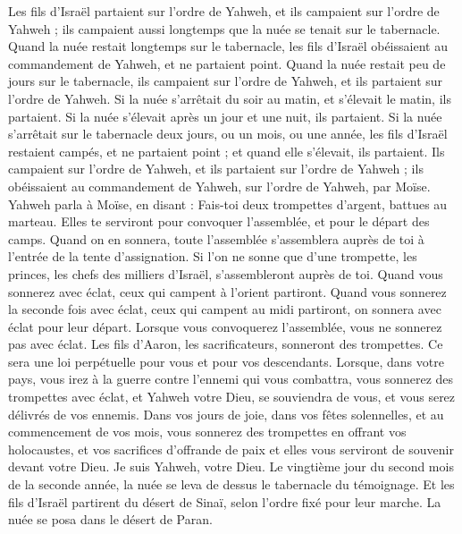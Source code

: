 \begin{multicols}{2}
Les fils d'Israël partaient sur l’ordre de Yahweh, et ils campaient sur l’ordre de Yahweh ; ils campaient aussi longtemps que la nuée se tenait sur le tabernacle.
Quand la nuée restait longtemps sur le tabernacle, les fils d'Israël obéissaient au commandement de Yahweh, et ne partaient point.
Quand la nuée restait peu de jours sur le tabernacle, ils campaient sur l’ordre de Yahweh, et ils partaient sur l’ordre de Yahweh.
Si la nuée s’arrêtait du soir au matin, et s’élevait le matin, ils partaient. Si la nuée s’élevait après un jour et une nuit, ils partaient.
Si la nuée s'arrêtait sur le tabernacle deux jours, ou un mois, ou une année, les fils d'Israël restaient campés, et ne partaient point ; et quand elle s’élevait, ils partaient.
Ils campaient sur l’ordre de Yahweh, et ils partaient sur l’ordre de Yahweh ; ils obéissaient au commandement de Yahweh, sur l’ordre de Yahweh, par Moïse.
\VerseOne{}Yahweh parla à Moïse, en disant :
Fais-toi deux trompettes d'argent, battues au marteau. Elles te serviront pour convoquer l'assemblée, et pour le départ des camps.
Quand on en sonnera, toute l'assemblée s'assemblera auprès de toi à l'entrée de la tente d'assignation.
Si l’on ne sonne que d'une trompette, les princes, les chefs des milliers d'Israël, s'assembleront auprès de toi.
Quand vous sonnerez avec éclat, ceux qui campent à l'orient partiront.
Quand vous sonnerez la seconde fois avec éclat, ceux qui campent au midi partiront, on sonnera avec éclat pour leur départ.
Lorsque vous convoquerez l'assemblée, vous ne sonnerez pas avec éclat.
Les fils d'Aaron, les sacrificateurs, sonneront des trompettes. Ce sera une loi perpétuelle pour vous et pour vos descendants.
Lorsque, dans votre pays, vous irez à la guerre contre l’ennemi qui vous combattra, vous sonnerez des trompettes avec éclat, et Yahweh votre Dieu, se souviendra de vous, et vous serez délivrés de vos ennemis.
Dans vos jours de joie, dans vos fêtes solennelles, et au commencement de vos mois, vous sonnerez des trompettes en offrant vos holocaustes, et vos sacrifices d’offrande de paix et elles vous serviront de souvenir devant votre Dieu. Je suis Yahweh, votre Dieu.
Le vingtième jour du second mois de la seconde année, la nuée se leva de dessus le tabernacle du témoignage.
Et les fils d'Israël partirent du désert de Sinaï, selon l’ordre fixé pour leur marche. La nuée se posa dans le désert de Paran.

\end{multicols}
